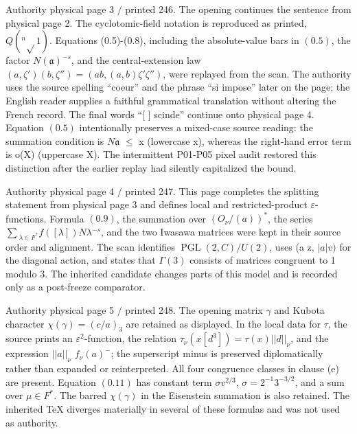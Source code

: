\documentclass[10pt,a4paper]{article}
\begin{document}
\clearpage
{}
\label{d035-physical-003}
\par Authority physical page 3 $/$ printed 246. The opening continues the sentence from physical page 2. The cyclotomic-field notation is reproduced as printed, $Q(^{n}\sqrt{}1)$. Equations (0.5)-(0.8), including the absolute-value bars in $(0.5)$, the factor $N(\mathfrak{a})^{-s}$, and the central-extension law $(a,\zeta{}')(b,\zeta{}'')=(ab,(a,b)\zeta{}'\zeta{}'')$, were replayed from the scan. The authority uses the source spelling ``coeur'' and the phrase ``si impose'' later on the page; the English reader supplies a faithful grammatical translation without altering the French record. The final words ``[ ] scinde'' continue onto physical page 4. Equation $(0.5)$ intentionally preserves a mixed-case source reading: the summation condition is $N\mathfrak{a}$ $\le{}$ x (lowercase x), whereas the right-hand error term is o(X) (uppercase X). The intermittent P01-P05 pixel audit restored this distinction after the earlier replay had silently capitalized the bound.\par

\clearpage
{}
\label{d035-physical-004}
\par Authority physical page 4 $/$ printed 247. This page completes the splitting statement from physical page 3 and defines local and restricted-product $\varepsilon{}$-functions. Formula $(0.9)$, the summation over $(O_\nu{}/(a))^*$, the series $\sum{}_{\lambda{}\in{}F^*}f([\lambda{}])N\lambda{}^{-s}$, and the two Iwasawa matrices were kept in their source order and alignment. The scan identifies $\operatorname{PGL}(2,C)/U(2)$, uses (a z, $|a|v)$ for the diagonal action, and states that $\Gamma{}(3)$ consists of matrices congruent to 1 modulo 3. The inherited candidate changes parts of this model and is recorded only as a post-freeze comparator.\par

\clearpage
{}
\label{d035-physical-005}
\par Authority physical page 5 $/$ printed 248. The opening matrix $\gamma{}$ and Kubota character $\chi{}(\gamma{})=(c/a)_3$ are retained as displayed. In the local data for $\tau{}$, the source prints an $\varepsilon{}^{2}$-function, the relation $\tau{}_\nu{}(x[d^3])=\tau{}(x)||d||_\nu{}$, and the expression $||a||_\nu{}$ $f_\nu{}(a)^{-}$; the superscript minus is preserved diplomatically rather than expanded or reinterpreted. All four congruence classes in clause (e) are present. Equation $(0.11)$ has constant term $\sigma{}v^{2/3}$, $\sigma{}=2^{-1}3^{-3/2}$, and a sum over $\mu{}\in{}F^*$. The barred $\chi{}(\gamma{})$ in the Eisenstein summation is also retained. The inherited TeX diverges materially in several of these formulas and was not used as authority.\par
\end{document}
